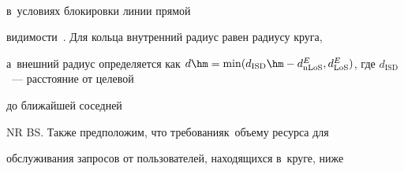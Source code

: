 \





\vspace*{-12pt}










\noindent


 в~условиях блокировки линии прямой 


видимости~\cite{2-bs}. Для кольца внут\-рен\-ний радиус равен радиусу \mbox{круга}, 


а~внешний радиус определяется как $d\hm= \min (d_{\mathrm{ISD}} 


\hm - d^E_{\mathrm{nLoS}}, 


d^E_{\mathrm{LoS}})$, где $d_{\mathrm{ISD}}$~--- расстояние от целевой 


до ближайшей соседней 


NR BS. Также предположим, что требования\linebreak к~объему ресурса для 


обслуживания запросов от пользователей, находящихся в~круге, ниже 


